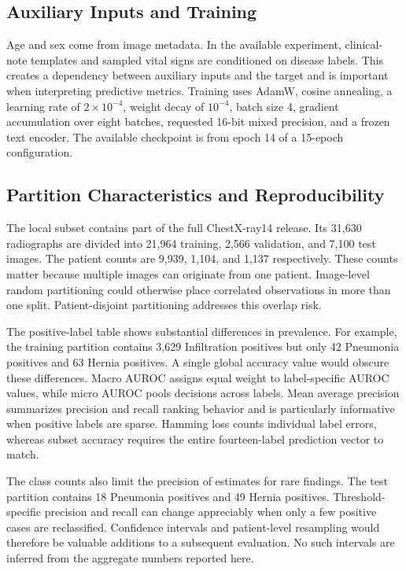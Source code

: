 \documentclass[pdflatex,sn-mathphys-num]{sn-jnl}
\begin{document}
\subsection{Auxiliary Inputs and Training}

Age and sex come from image metadata. In the available experiment, clinical-note templates and sampled vital signs are conditioned on disease labels. This creates a dependency between auxiliary inputs and the target and is important when interpreting predictive metrics. Training uses AdamW, cosine annealing, a learning rate of $2\times10^{-4}$, weight decay of $10^{-4}$, batch size 4, gradient accumulation over eight batches, requested 16-bit mixed precision, and a frozen text encoder. The available checkpoint is from epoch 14 of a 15-epoch configuration.

\subsection{Partition Characteristics and Reproducibility}

The local subset contains part of the full ChestX-ray14 release. Its 31,630 radiographs are divided into 21,964 training, 2,566 validation, and 7,100 test images. The patient counts are 9,939, 1,104, and 1,137 respectively. These counts matter because multiple images can originate from one patient. Image-level random partitioning could otherwise place correlated observations in more than one split. Patient-disjoint partitioning addresses this overlap risk.

The positive-label table shows substantial differences in prevalence. For example, the training partition contains 3,629 Infiltration positives but only 42 Pneumonia positives and 63 Hernia positives. A single global accuracy value would obscure these differences. Macro AUROC assigns equal weight to label-specific AUROC values, while micro AUROC pools decisions across labels. Mean average precision summarizes precision and recall ranking behavior and is particularly informative when positive labels are sparse. Hamming loss counts individual label errors, whereas subset accuracy requires the entire fourteen-label prediction vector to match.

The class counts also limit the precision of estimates for rare findings. The test partition contains 18 Pneumonia positives and 49 Hernia positives. Threshold-specific precision and recall can change appreciably when only a few positive cases are reclassified. Confidence intervals and patient-level resampling would therefore be valuable additions to a subsequent evaluation. No such intervals are inferred from the aggregate numbers reported here.
\end{document}
